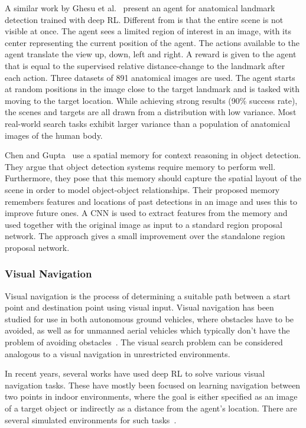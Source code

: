 A similar work by Ghesu et al.~\cite{ourselin_artificial_2016} present an agent for anatomical landmark detection trained with deep RL.
Different from \cite{caicedo_active_2015} is that the entire scene is not visible at once.
The agent sees a limited region of interest in an image, with its center representing the current position of the agent.
The actions available to the agent translate the view up, down, left and right.
A reward is given to the agent that is equal to the supervised relative distance-change to the landmark after each action.
Three datasets of 891 anatomical images are used.
The agent starts at random positions in the image close to the target landmark and is tasked with moving to the target location.
While achieving strong results (90\% success rate), the scenes and targets are all drawn from a distribution with low variance.
Most real-world search tasks exhibit larger variance than a population of anatomical images of the human body.

Chen and Gupta~\cite{chen_spatial_2017} use a spatial memory for context reasoning in object detection.
They argue that object detection systems require memory to perform well.
Furthermore, they pose that this memory should capture the spatial layout of the scene in order to model object-object relationships.
Their proposed memory remembers features and locations of past detections in an image and uses this to improve future ones.
A CNN is used to extract features from the memory and used together with the original image as input to a standard region proposal network.
The approach gives a small improvement over the standalone region proposal network.

\subsubsection{Visual Navigation}

Visual navigation is the process of determining a suitable path between a start point and destination point using visual input.
Visual navigation has been studied for use in both autonomous ground vehicles, where obstacles have to be avoided, as well as for unmanned aerial vehicles which typically don't have the problem of avoiding obstacles~\cite{bonin-font_visual_2008}.
The visual search problem can be considered analogous to a visual navigation in unrestricted environments.

In recent years, several works have used deep RL to solve various visual navigation tasks.
These have mostly been focused on learning navigation between two points in indoor environments,
where the goal is either specified as an image of a target object or indirectly as a distance from the agent's location.
There are several simulated environments for such tasks~\cite{kolve_ai2-thor_2019,xia_gibson_2018,savva_habitat_2019}.

